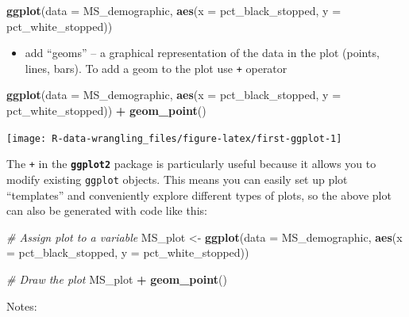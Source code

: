 \documentclass[]{book}
\newenvironment{Shaded}{\begin{snugshade}}{\end{snugshade}}
\newcommand{\KeywordTok}[1]{\textcolor[rgb]{0.13,0.29,0.53}{\textbf{#1}}}
\newcommand{\DataTypeTok}[1]{\textcolor[rgb]{0.13,0.29,0.53}{#1}}
\newcommand{\StringTok}[1]{\textcolor[rgb]{0.31,0.60,0.02}{#1}}
\newcommand{\CommentTok}[1]{\textcolor[rgb]{0.56,0.35,0.01}{\textit{#1}}}
\newcommand{\OperatorTok}[1]{\textcolor[rgb]{0.81,0.36,0.00}{\textbf{#1}}}
\newcommand{\NormalTok}[1]{#1}
\providecommand{\tightlist}{%
  \setlength{\itemsep}{0pt}\setlength{\parskip}{0pt}}
\theoremstyle{definition}
\theoremstyle{definition}
\theoremstyle{definition}
\theoremstyle{remark}
\begin{document}
\begin{Shaded}
\begin{Highlighting}[]
\KeywordTok{ggplot}\NormalTok{(}\DataTypeTok{data =}\NormalTok{ MS_demographic, }\KeywordTok{aes}\NormalTok{(}\DataTypeTok{x =}\NormalTok{ pct_black_stopped, }\DataTypeTok{y =}\NormalTok{ pct_white_stopped))}
\end{Highlighting}
\end{Shaded}

\begin{itemize}
\tightlist
\item
  add ``geoms'' -- a graphical representation of the data in the plot
  (points, lines, bars). To add a geom to the plot use \texttt{+}
  operator
\end{itemize}

\begin{Shaded}
\begin{Highlighting}[]
\KeywordTok{ggplot}\NormalTok{(}\DataTypeTok{data =}\NormalTok{ MS_demographic, }\KeywordTok{aes}\NormalTok{(}\DataTypeTok{x =}\NormalTok{ pct_black_stopped, }\DataTypeTok{y =}\NormalTok{ pct_white_stopped)) }\OperatorTok{+}
\StringTok{  }\KeywordTok{geom_point}\NormalTok{()}
\end{Highlighting}
\end{Shaded}

\texttt{[image: R-data-wrangling\_files/figure-latex/first-ggplot-1]}

The \texttt{+} in the \textbf{\texttt{ggplot2}} package is particularly
useful because it allows you to modify existing \texttt{ggplot} objects.
This means you can easily set up plot ``templates'' and conveniently
explore different types of plots, so the above plot can also be
generated with code like this:

\begin{Shaded}
\begin{Highlighting}[]
\CommentTok{# Assign plot to a variable}
\NormalTok{MS_plot <-}\StringTok{ }\KeywordTok{ggplot}\NormalTok{(}\DataTypeTok{data =}\NormalTok{ MS_demographic, }\KeywordTok{aes}\NormalTok{(}\DataTypeTok{x =}\NormalTok{ pct_black_stopped, }\DataTypeTok{y =}\NormalTok{ pct_white_stopped))}

\CommentTok{# Draw the plot}
\NormalTok{MS_plot }\OperatorTok{+}\StringTok{ }\KeywordTok{geom_point}\NormalTok{()}
\end{Highlighting}
\end{Shaded}

Notes:
\end{document}
